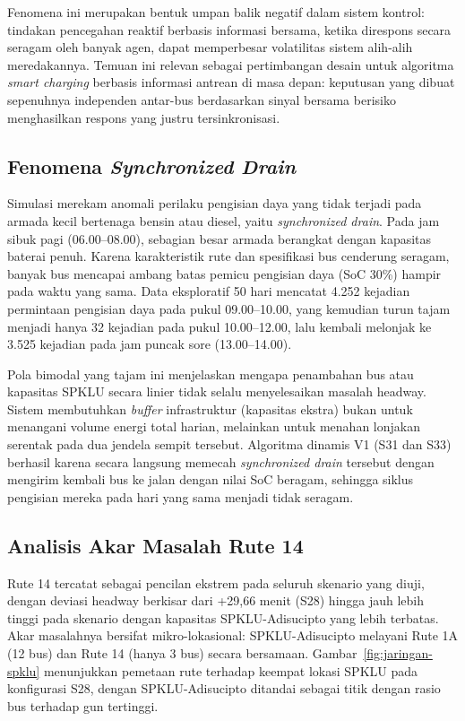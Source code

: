 Fenomena ini merupakan bentuk umpan balik negatif dalam sistem kontrol:
tindakan pencegahan reaktif berbasis informasi bersama, ketika direspons
secara seragam oleh banyak agen, dapat memperbesar volatilitas sistem
alih-alih meredakannya. Temuan ini relevan sebagai pertimbangan desain
untuk algoritma \textit{smart charging} berbasis informasi antrean di
masa depan: keputusan yang dibuat sepenuhnya independen antar-bus
berdasarkan sinyal bersama berisiko menghasilkan respons yang justru
tersinkronisasi.

\subsection{Fenomena \textit{Synchronized Drain}}

Simulasi merekam anomali perilaku pengisian daya yang tidak terjadi pada
armada kecil bertenaga bensin atau diesel, yaitu \textit{synchronized drain}.
Pada jam sibuk pagi (06.00--08.00), sebagian besar armada berangkat dengan
kapasitas baterai penuh. Karena karakteristik rute dan spesifikasi bus
cenderung seragam, banyak bus mencapai ambang batas pemicu pengisian
daya (SoC 30\%) hampir pada waktu yang sama. Data eksploratif 50 hari
mencatat 4.252 kejadian permintaan pengisian daya pada pukul 09.00--10.00,
yang kemudian turun tajam menjadi hanya 32 kejadian pada pukul 10.00--12.00,
lalu kembali melonjak ke 3.525 kejadian pada jam puncak sore (13.00--14.00).

Pola bimodal yang tajam ini menjelaskan mengapa penambahan bus atau
kapasitas SPKLU secara linier tidak selalu menyelesaikan masalah headway.
Sistem membutuhkan \textit{buffer} infrastruktur (kapasitas ekstra)
bukan untuk menangani volume energi total harian, melainkan untuk menahan
lonjakan serentak pada dua jendela sempit tersebut. Algoritma dinamis V1
(S31 dan S33) berhasil karena secara langsung memecah \textit{synchronized drain}
tersebut dengan mengirim kembali bus ke jalan dengan nilai SoC beragam,
sehingga siklus pengisian mereka pada hari yang sama menjadi tidak seragam.



\subsection{Analisis Akar Masalah Rute 14}

Rute 14 tercatat sebagai pencilan ekstrem pada seluruh skenario yang
diuji, dengan deviasi headway berkisar dari +29,66 menit (S28) hingga
jauh lebih tinggi pada skenario dengan kapasitas SPKLU-Adisucipto yang
lebih terbatas. Akar masalahnya bersifat mikro-lokasional: SPKLU-Adisucipto
melayani Rute 1A (12 bus) dan Rute 14 (hanya 3 bus) secara bersamaan.
Gambar~\ref{fig:jaringan-spklu} menunjukkan pemetaan rute terhadap
keempat lokasi SPKLU pada konfigurasi S28, dengan SPKLU-Adisucipto
ditandai sebagai titik dengan rasio bus terhadap gun tertinggi.

